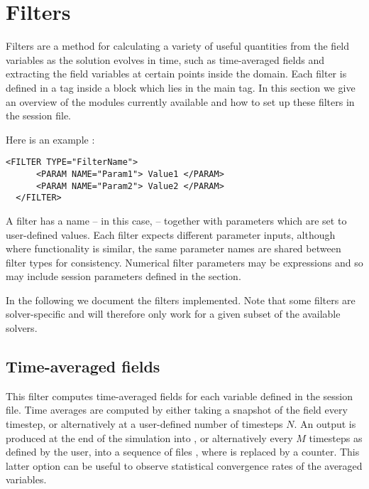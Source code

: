 \section{Filters}

Filters are a method for calculating a variety of useful quantities from the
field variables as the solution evolves in time, such as time-averaged fields
and extracting the field variables at certain points inside the domain. Each
filter is defined in a  tag inside a  block which
lies in the main  tag. In this section we give an overview of the
modules currently available and how to set up these filters in the session file.

Here is an example :

\begin{lstlisting}[style=XMLStyle,gobble=2]
  <FILTER TYPE="FilterName">
      <PARAM NAME="Param1"> Value1 </PARAM>
      <PARAM NAME="Param2"> Value2 </PARAM>
  </FILTER>
\end{lstlisting}

A filter has a name -- in this case,  -- together with
parameters which are set to user-defined values. Each filter expects different
parameter inputs, although where functionality is similar, the same parameter
names are shared between filter types for consistency. Numerical filter
parameters may be expressions and so may include session parameters defined in
the  section.

In the following we document the filters implemented. Note that some filters are
solver-specific and will therefore only work for a given subset of the available
solvers.

\subsection{Time-averaged fields}

This filter computes time-averaged fields for each variable defined in the
session file. Time averages are computed by either taking a snapshot of the
field every timestep, or alternatively at a user-defined number of timesteps
$N$. An output is produced at the end of the simulation into
, or alternatively every $M$ timesteps as defined by the
user, into a sequence of files , where \inltt{*} is
replaced by a counter. This latter option can be useful to observe statistical
convergence rates of the averaged variables.

